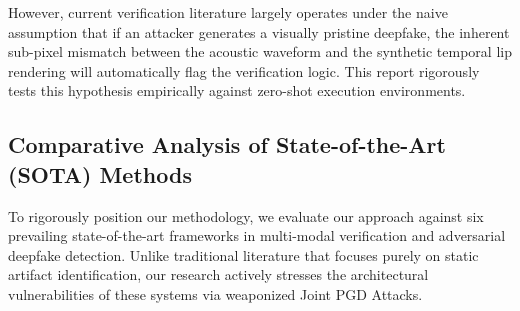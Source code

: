 \documentclass[conference]{IEEEtran}
\begin{document}
However, current verification literature largely operates under the naive assumption that if an attacker generates a visually pristine deepfake, the inherent sub-pixel mismatch between the acoustic waveform and the synthetic temporal lip rendering will automatically flag the verification logic. This report rigorously tests this hypothesis empirically against zero-shot execution environments.

\subsection{Comparative Analysis of State-of-the-Art (SOTA) Methods}
To rigorously position our methodology, we evaluate our approach against six prevailing state-of-the-art frameworks in multi-modal verification and adversarial deepfake detection. Unlike traditional literature that focuses purely on static artifact identification, our research actively stresses the architectural vulnerabilities of these systems via weaponized Joint PGD Attacks. 
\end{document}
